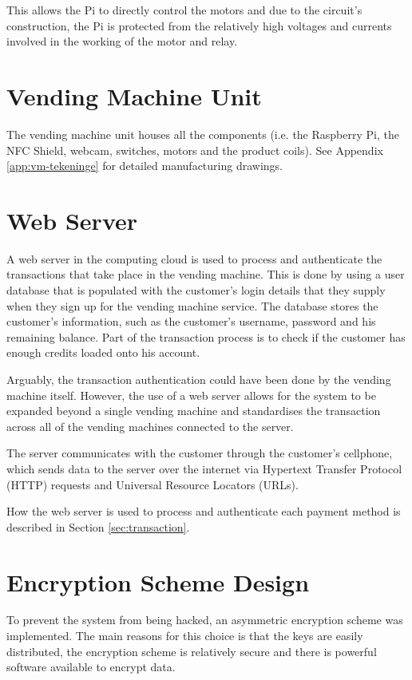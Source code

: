 This allows the Pi to directly control the motors and due to the circuit's construction, the Pi
is protected from the relatively high voltages and currents involved in the working of the
motor and relay.

\section{Vending Machine Unit}

The vending machine unit houses all the components (i.e. the Raspberry Pi, the NFC Shield,
webcam, switches, motors and the product coils). See Appendix \ref{app:vm-tekeninge} 
for detailed manufacturing drawings.

\section{Web Server}

A web server in the computing cloud is used to process and authenticate the
transactions that take place in the vending machine. This is done by
using a user database that is populated with the customer's login details that
they supply when they sign up for the vending machine service. The database
stores the customer's information, such as the customer's username, password and
his remaining balance. Part of the transaction process is to check if the
customer has enough credits loaded onto his account. 

Arguably, the transaction authentication could have been done by the vending
machine itself. However, the use of a web server allows for the system to be
expanded beyond a single vending machine and standardises the transaction
across all of the vending machines connected to the server.

The server communicates with the customer through the customer's cellphone,
which sends data to the server over the internet via Hypertext Transfer Protocol
(HTTP) requests and Universal Resource Locators (URLs).

How the web server is used to process and authenticate each payment method is
described in Section \ref{sec:transaction}.
 
\section{Encryption Scheme Design}

To prevent the system from being hacked, an asymmetric encryption scheme was
implemented. The main reasons for this choice is that the keys are easily
distributed, the encryption scheme is relatively secure and there is powerful
software available to encrypt data.


